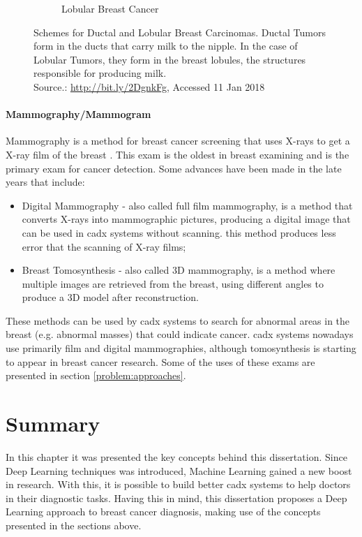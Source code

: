 \documentclass[
  twoside,
  11pt, a4paper,
  footinclude=true,
  headinclude=true,
  cleardoublepage=empty
]{scrbook}
\begin{document}
{\begin{figure}[t]
\begin{subfigure}[t]{0.5\textwidth}
                  \caption{Lobular Breast Cancer}
                  \label{background:medical-image:breast-cancer-diagnosis:lobular}
                \end{subfigure}
                \caption[Schemes for Ductal and Lobular Breast Carcinomas]{Schemes for Ductal and Lobular Breast Carcinomas. Ductal Tumors form in the ducts that carry milk to the nipple. In the case of Lobular Tumors, they form in the breast lobules, the structures responsible for producing milk.\\Source.: \href{http://bit.ly/2DgnkFg}{http://bit.ly/2DgnkFg}, Accessed 11 Jan 2018}
                \label{background:medical-image:breast-cancer-diagnosis:types}
            \end{figure}
        }

        \paragraph{Mammography/Mammogram}
          Mammography is a method for breast cancer screening that uses X-rays to get a X-ray film of the breast \cite{starting2012mammography}. This exam is the oldest in breast examining and is the primary exam for cancer detection. Some advances have been made in the late years that include:

          \begin{itemize}
            \item Digital Mammography - also called full film mammography, is a method that converts X-rays into mammographic pictures, producing a digital image that can be used in \gls{cadx} systems without scanning. this method produces less error that the scanning of X-ray films;
            \item Breast Tomosynthesis - also called 3D mammography, is a method where multiple images are retrieved from the breast, using different angles to produce a 3D model after reconstruction.
          \end{itemize}

          These methods can be used by \gls{cadx} systems to search for abnormal areas in the breast (e.g. abnormal masses) that could indicate cancer. \gls{cadx} systems nowadays use primarily film and digital mammographies, although tomosynthesis is starting to appear in breast cancer research. Some of the uses of these exams are presented in section \ref{problem:approaches}.

    \section{Summary} \label{background:summary}
      In this chapter it was presented the key concepts behind this dissertation. Since Deep Learning techniques was introduced, Machine Learning gained a new boost in research. With this, it is possible to build better \gls{cadx} systems to help doctors in their diagnostic tasks. Having this in mind, this dissertation proposes a Deep Learning approach to breast cancer diagnosis, making use of the concepts presented in the sections above. %
\end{document}
